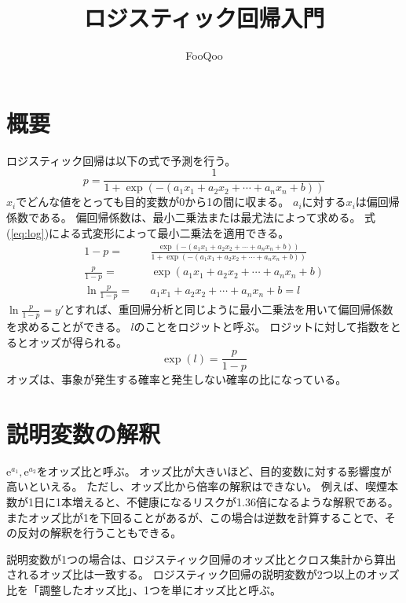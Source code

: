 \documentclass{ltjsarticle}
\title{ロジスティック回帰入門}
\author{FooQoo}
\begin{document}
\maketitle
\section{概要}
ロジスティック回帰は以下の式で予測を行う。
\begin{equation}
    p = \frac{1}{1+\exp(-(a_1 x_1 + a_2 x_2 + \cdots + a_n x_n + b))}
\end{equation}
$x_i$でどんな値をとっても目的変数が0から1の間に収まる。
$a_i$に対する$x_i$は偏回帰係数である。
偏回帰係数は、最小二乗法または最尤法によって求める。
式(\ref{eq:log})による式変形によって最小二乗法を適用できる。
\begin{eqnarray}
    1 - p =& &\frac{\exp(-(a_1 x_1 + a_2 x_2 + \cdots + a_n x_n + b))}{1 + \exp(-(a_1 x_1 + a_2 x_2 + \cdots + a_n x_n + b))} \\
    \frac{p}{1-p} =& &\exp(a_1 x_1 + a_2 x_2 + \cdots + a_n x_n + b) \\
    \ln{\frac{p}{1-p}} =& &a_1 x_1 + a_2 x_2 + \cdots + a_n x_n + b = l
    \label{eq:log}
\end{eqnarray}
$\ln{\frac{p}{1-p}}=y'$とすれば、重回帰分析と同じように最小二乗法を用いて偏回帰係数を求めることができる。
$l$のことをロジットと呼ぶ。
ロジットに対して指数をとるとオッズが得られる。
\begin{equation}
    \exp(l) = \frac{p}{1-p}
\end{equation}
オッズは、事象が発生する確率と発生しない確率の比になっている。

\section{説明変数の解釈}
$\mathrm{e}^{a_1}, \mathrm{e}^{a_2}$をオッズ比と呼ぶ。
オッズ比が大きいほど、目的変数に対する影響度が高いといえる。
ただし、オッズ比から倍率の解釈はできない。
例えば、喫煙本数が1日に1本増えると、不健康になるリスクが1.36倍になるような解釈である。
またオッズ比が1を下回ることがあるが、この場合は逆数を計算することで、その反対の解釈を行うこともできる。

説明変数が1つの場合は、ロジスティック回帰のオッズ比とクロス集計から算出されるオッズ比は一致する。
ロジスティック回帰の説明変数が2つ以上のオッズ比を「調整したオッズ比」、1つを単にオッズ比と呼ぶ。
\end{document}
